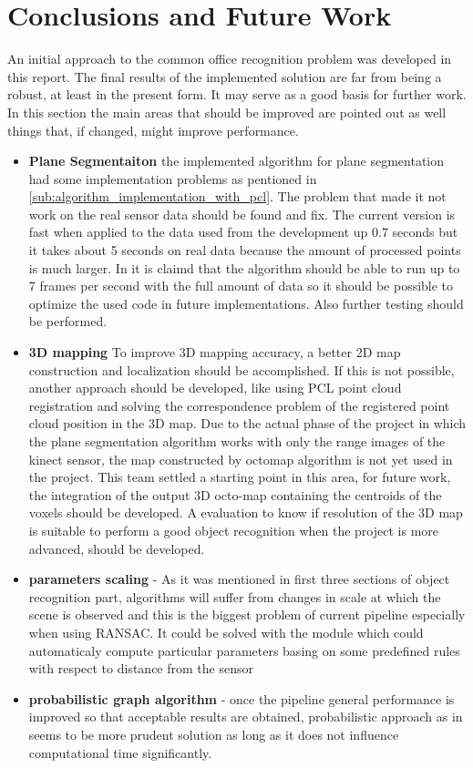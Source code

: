 \documentclass[fontsize=12pt]{article}
\begin{document}
\section{Conclusions and Future Work}
\label{sec:Future Work}
An initial approach to the common office recognition problem was developed in this report. The final results of the implemented solution are far from being a robust, at least in the present form. It may serve as a good basis for further work. In this section the main areas that should be improved are pointed out as well things that, if changed, might improve performance.
\begin{itemize}
    \item \textbf{Plane Segmentaiton} the implemented algorithm for plane segmentation had some implementation problems as pentioned in \ref{sub:algorithm_implementation_with_pcl}. The problem that made it not work on the real sensor data should be found and fix. The current version is fast when applied to the data used from the development up 0.7 seconds but it takes about 5 seconds on real data because the amount of processed points is much larger. In \cite{bib:planes_paper} it is claimd that the algorithm should be able to run up to 7 frames per second with the full amount of data so it should be possible to optimize the used code in future implementations. Also further testing should be performed.

\item \textbf{3D mapping} To improve 3D mapping accuracy, a better 2D map construction and localization should be accomplished. If this is not possible, another approach should be developed,  like using PCL point cloud registration and solving the correspondence problem of the registered point cloud position in the 3D map. Due to the actual phase of the project in which the plane segmentation algorithm works with only the range images of the kinect sensor, the  map constructed by octomap algorithm is not yet used in the project. This team settled a starting point in this area, for future work, the integration of the output 3D octo-map containing the centroids of the voxels should be developed. A evaluation to know if  resolution of the 3D map  is suitable to perform a good object recognition when the project is more advanced, should be developed.
  \item \textbf{parameters scaling} - As it was mentioned in first three sections of object recognition part, algorithms will suffer from changes in scale at which the scene is observed and this is the biggest problem of current pipeline especially when using RANSAC. It could be solved with the module which could automaticaly compute particular parameters basing on some predefined rules with respect to distance from the sensor
  \item \textbf{probabilistic graph algorithm} - once the pipeline general performance is improved so that acceptable results are obtained, probabilistic approach as in \cite{pap1} seems to be more prudent solution as long as it does not influence computational time significantly.
\end{itemize}
\end{document}
